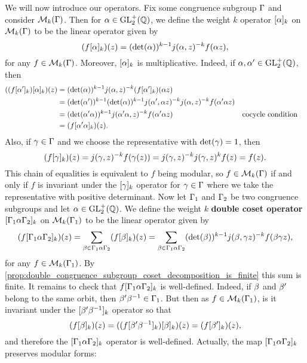       We will now introduce our operators. Fix some congruence subgroup $\Gamma$ and consider $\mathcal{M}_{k}(\Gamma)$. Then for $\alpha \in \mathrm{GL}_{2}^{+}(\mathbb{Q})$, we define the weight $k$ operator $[\alpha]_{k}$ on $\mathcal{M}_{k}(\Gamma)$ to be the linear operator given by
      \[
        (f[\alpha]_{k})(z) = (\det(\alpha))^{k-1}j(\alpha,z)^{-k}f(\alpha z),
      \]
      for any $f \in \mathcal{M}_{k}(\Gamma)$. Moreover, $[\alpha]_{k}$ is multiplicative. Indeed, if $\alpha,\alpha' \in \mathrm{GL}_{2}^{+}(\mathbb{Q})$, then
      \begin{align*}
        ((f[\alpha']_{k})[\alpha]_{k})(z) &= (\det(\alpha))^{k-1}j(\alpha,z)^{-k}(f[\alpha']_{k})(\alpha z) \\
        &= (\det(\alpha'))^{k-1}(\det(\alpha))^{k-1}j(\alpha',\alpha z)^{-k}j(\alpha,z)^{-k}f(\alpha'\alpha z) \\
        &= (\det(\alpha'\alpha))^{k-1}j(\alpha'\alpha,z)^{-k}f(\alpha'\alpha z) && \text{cocycle condition} \\
        &= (f[\alpha'\alpha]_{k})(z).
      \end{align*}
      Also, if $\gamma \in \Gamma$ and we choose the representative with $\det(\gamma) = 1$, then
      \[
        (f[\gamma]_{k})(z) = j(\gamma,z)^{-k}f(\gamma(z)) = j(\gamma,z)^{-k}j(\gamma,z)^{k}f(z) = f(z).
      \]
      This chain of equalities is equivalent to $f$ being modular, so $f \in \mathcal{M}_{k}(\Gamma)$ if and only if $f$ is invariant under the $[\gamma]_{k}$ operator for $\gamma \in \Gamma$ where we take the representative with positive determinant. Now let $\Gamma_{1}$ and $\Gamma_{2}$ be two congruence subgroups and let $\alpha \in \mathrm{GL}_{2}^{+}(\mathbb{Q})$. We define the weight $k$ \textbf{double coset operator} $[\Gamma_{1}\alpha\Gamma_{2}]_{k}$ on $\mathcal{M}_{k}(\Gamma_{1})$ to be the linear operator given by
      \[
        (f[\Gamma_{1}\alpha\Gamma_{2}]_{k})(z) = \sum_{\beta \in \Gamma_{1}\alpha\Gamma_{2}}(f[\beta]_{k})(z) = \sum_{\beta \in \Gamma_{1}\alpha\Gamma_{2}}(\det(\beta))^{k-1}j(\beta,\gamma z)^{-k}f(\beta\gamma z),
      \]
      for any $f \in \mathcal{M}_{k}(\Gamma_{1})$. By \cref{prop:double_congruence_subgroup_coset_decomposition_is_finite} this sum is finite. It remains to check that $f[\Gamma_{1}\alpha\Gamma_{2}]_{k}$ is well-defined. Indeed, if $\beta$ and $\beta'$ belong to the same orbit, then $\beta'\beta^{-1} \in \Gamma_{1}$. But then as $f \in \mathcal{M}_{k}(\Gamma_{1})$, is it invariant under the $[\beta'\beta^{-1}]_{k}$ operator so that
      \[
        (f[\beta]_{k})(z) = ((f[\beta'\beta^{-1}]_{k})[\beta]_{k})(z) = (f[\beta']_{k})(z),
      \]
      and therefore the $[\Gamma_{1}\alpha\Gamma_{2}]_{k}$ operator is well-defined. Actually, the map $[\Gamma_{1}\alpha\Gamma_{2}]_{k}$ preserves modular forms:

